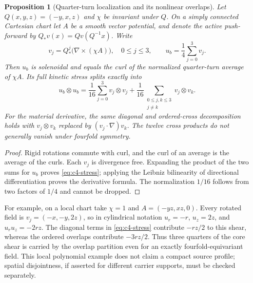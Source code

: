 \documentclass[11pt,a4paper]{article}
\theoremstyle{plain}
\newtheorem{proposition}[theorem]{Proposition}
\theoremstyle{definition}
\begin{document}
\begin{proposition}[Quarter-turn localization and its nonlinear overlaps]
\label{prop:c4-overlap}
Let $Q(x,y,z)=(-y,x,z)$ and $\chi$ be invariant under $Q$. On a
simply connected Cartesian chart let $A$ be a smooth vector potential,
and denote the active push-forward by
$Q_*v(x)=Qv(Q^{-1}x)$. Write
\[
 v_j=Q_*^j\bigl(\nabla\times(\chi A)\bigr),\quad 0\le j\le3,
 \qquad u_b=\frac14\sum_{j=0}^3v_j.
\]
Then $u_b$ is solenoidal and equals the curl of the normalized
quarter-turn average of $\chi A$. Its full kinetic stress splits
exactly into
\begin{equation}\label{eq:c4-stress}
 u_b\otimes u_b=\frac1{16}\sum_{j=0}^3v_j\otimes v_j
 +\frac1{16}\sum_{\substack{0\le j,k\le3\\j\ne k}}
     v_j\otimes v_k.
\end{equation}
For the material derivative, the same diagonal and ordered-cross
decomposition holds with $v_j\otimes v_k$ replaced by
$(v_j\cdot\nabla)v_k$. The twelve cross products do not generally
vanish under fourfold symmetry.
\end{proposition}

\begin{proof}
Rigid rotations commute with curl, and the curl of an average is
the average of the curls. Each $v_j$ is divergence free. Expanding
the product of the two sums for $u_b$ proves
\eqref{eq:c4-stress}; applying the Leibniz bilinearity of directional
differentiation proves the derivative formula. The normalization
$1/16$ follows from two factors of $1/4$ and cannot be dropped.
\end{proof}

For example, on a local chart take $\chi=1$ and
$A=(-yz,xz,0)$. Every rotated field is
$v_j=(-x,-y,2z)$, so in cylindrical notation
$u_r=-r$, $u_z=2z$, and $u_r u_z=-2rz$. The diagonal terms in
\eqref{eq:c4-stress} contribute $-rz/2$ to this shear, whereas
the ordered overlaps contribute $-3rz/2$. Thus three quarters of
the core shear is carried by the overlap partition even for an
exactly fourfold-equivariant field. This local polynomial example
does not claim a compact source profile; spatial disjointness, if
asserted for different carrier supports, must be checked separately.
\end{document}
